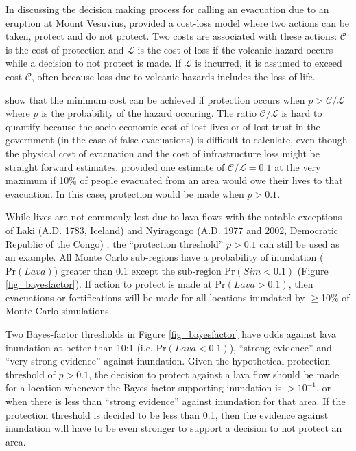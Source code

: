 	In discussing the decision making process for calling an evacuation due to an eruption at Mount Vesuvius, \citet{marzocchi2007probabilistic} provided a cost-loss model where two actions can be taken, protect and do not protect. Two costs are associated with these actions: $\mathcal{C}$ is the cost of protection and $\mathcal{L}$ is the cost of loss if the volcanic hazard occurs while a decision to not protect is made. If $\mathcal{L}$ is incurred, it is assumed to exceed cost $\mathcal{C}$, often because loss due to volcanic hazards includes the loss of life.
	
	\citet{marzocchi2007probabilistic} show that the minimum cost can be achieved if protection occurs when $p>\mathcal{C}/\mathcal{L}$ where $p$ is the probability of the hazard occuring. The ratio $\mathcal{C}/\mathcal{L}$ is hard to quantify because the socio-economic cost of lost lives or of lost trust in the government (in the case of false evacuations) is difficult to calculate, even though the physical cost of evacuation and the cost of infrastructure loss might be straight forward estimates. \citet{woo2008probabilistic} provided one estimate of $\mathcal{C}/\mathcal{L}=0.1$ at the very maximum if 10\% of people evacuated from an area would owe their lives to that evacuation. In this case, protection would be made when $p>0.1$.
	
	While lives are not commonly lost due to lava flows with the notable exceptions of Laki (A.D. 1783, Iceland) and Nyiragongo (A.D. 1977 and 2002, Democratic Republic of the Congo) \citep{peterson2000lava}, the ``protection threshold'' $p>0.1$ can still be used as an example. All Monte Carlo sub-regions have a probability of inundation ($\text{Pr}(Lava)$) greater than 0.1 except the sub-region $\text{Pr}(Sim<0.1)$ (Figure \ref{fig_bayesfactor}). If action to protect is made at $\text{Pr}(Lava>0.1)$, then evacuations or fortifications will be made for all locations inundated by $\ge$10\% of Monte Carlo simulations.
	
	Two Bayes-factor thresholds in Figure \ref{fig_bayesfactor} have odds against lava inundation at better than 10:1 (i.e. $\text{Pr}(Lava<0.1)$), ``strong evidence'' and ``very strong evidence'' against inundation. Given the hypothetical protection threshold of $p>0.1$, the decision to protect against a lava flow should be made for a location whenever the Bayes factor supporting inundation is $>10^{-1}$, or when there is less than ``strong evidence'' against inundation for that area. If the protection threshold is decided to be less than 0.1, then the evidence against inundation will have to be even stronger to support a decision to not protect an area. 
	
